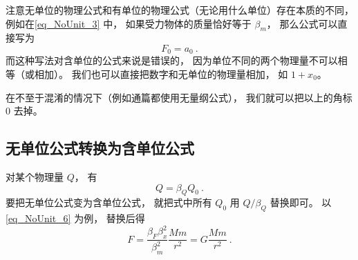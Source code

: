 注意无单位的物理公式和有单位的物理公式（无论用什么单位）存在本质的不同， 例如在\autoref{eq_NoUnit_3} 中， 如果受力物体的质量恰好等于 $\beta_m$， 那么公式可以直接写为
\begin{equation}\label{eq_NoUnit_7}
F_0 = a_0~.
\end{equation}
而这种写法对含单位的公式来说是错误的， 因为单位不同的两个物理量不可以相等（或相加）。 我们也可以直接把数字和无单位的物理量相加， 如 $1 + x_0$。

在不至于混淆的情况下（例如通篇都使用无量纲公式）， 我们就可以把以上的角标 $0$ 去掉。

\subsection{无单位公式转换为含单位公式}
对某个物理量 $Q$， 有
\begin{equation}
Q = \beta_Q Q_0~.
\end{equation}
要把无单位公式变为含单位公式， 就把式中所有 $Q_0$ 用 $Q/\beta_Q$ 替换即可。 以\autoref{eq_NoUnit_6} 为例， 替换后得
\begin{equation}
F = \frac{\beta_F\beta_x^2}{\beta_m^2} \frac{Mm}{r^2} = G\frac{Mm}{r^2}~.
\end{equation}
